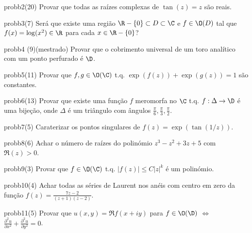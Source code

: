 \begin{restatable}{prob}{b2}(20)
Provar que todas as raízes complexas de $\tan(z) = z$ são reais.
\end{restatable}

\begin{restatable}{prob}{b3}(7)
Será que existe uma região $\R-\{0\} \subset D\subset \C$ e $f\in\O(D)$ tal que
$f(x) = \log (x^2) \in \R$ para cada $x\in\R-\{0\}$?
\end{restatable}

\begin{restatable}{prob}{b4} (9)(mestrado)
Provar que o cobrimento universal de um toro analítico com um ponto perfurado
é $\D$.
\end{restatable}

\begin{restatable}{prob}{b5}(11)
Provar que 
$f,g\in\O(\C)$ t.q. $\exp(f(z)) + \exp(g(z)) = 1$
são constantes.
\end{restatable}

\begin{restatable}{prob}{b6}(13)
Provar que existe uma função $f$ meromorfa no $\C$ t.q. $f : \Delta \to \D$ é uma bijeção,
onde $\Delta$ é um triângulo com ângulos $\frac{\pi}{6},\frac{\pi}{3},\frac{\pi}{2}$.
\end{restatable}

\begin{restatable}{prob}{b7}(5)
Caraterizar os pontos singulares de $f(z) = \exp(\tan(1/z))$.
\end{restatable}

\begin{restatable}{prob}{b8}(6)
Achar o número de raízes do polinómio $z^3-z^2+3z+5$ com $\Re(z)>0$.
\end{restatable}

\begin{restatable}{prob}{b9}(3)
Provar que $f\in\O(\C)$ t.q. $|f(z)|\leq C |z|^k$ é um polinómio.
\end{restatable}

\begin{restatable}{prob}{b10}(4)
Achar todas as séries de Laurent nos anéis com centro em zero da função $f(z) = \frac{7z-2}{(z+1)(z-2)}$.
\end{restatable}

\begin{restatable}{prob}{b11}(5)
Provar que $u(x,y) = \Re f(x+iy)$ para $f\in\O(\D)$ $\iff$ 
$\frac{\partial^2 u}{\partial x^2} + \frac{\partial^2 u}{\partial y^2} = 0$.
\end{restatable}




